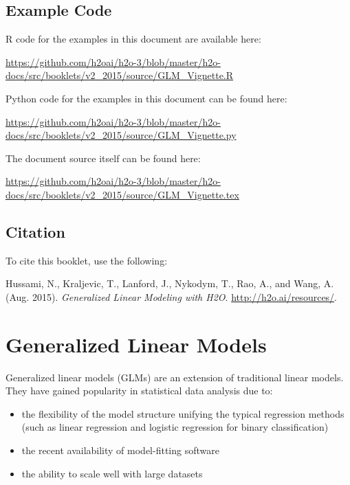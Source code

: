 



\newcommand{\waterVersion}{3.2.0.1}


\subsection{Example Code}

R code for the examples in this document are available here:

\url{https://github.com/h2oai/h2o-3/blob/master/h2o-docs/src/booklets/v2_2015/source/GLM_Vignette.R}

Python code for the examples in this document can be found here:

\url{https://github.com/h2oai/h2o-3/blob/master/h2o-docs/src/booklets/v2_2015/source/GLM_Vignette.py}

The document source itself can be found here:

\url{https://github.com/h2oai/h2o-3/blob/master/h2o-docs/src/booklets/v2_2015/source/GLM_Vignette.tex}

\subsection{Citation}

To cite this booklet, use the following: 

Hussami, N., Kraljevic, T., Lanford, J., Nykodym, T., Rao, A., and Wang, A. (Aug. 2015). {\textit{Generalized Linear Modeling with H2O}}. {\url{http://h2o.ai/resources/}}. 


\section{Generalized Linear Models}

Generalized linear models (GLMs) are an extension of traditional linear models. They have gained popularity in statistical data analysis due to: 
\begin{itemize}
\item the flexibility of the model structure unifying the typical regression methods (such as linear regression and logistic regression for binary classification)
\item the recent availability of model-fitting software
\item the ability to scale well with large datasets
\end{itemize}

